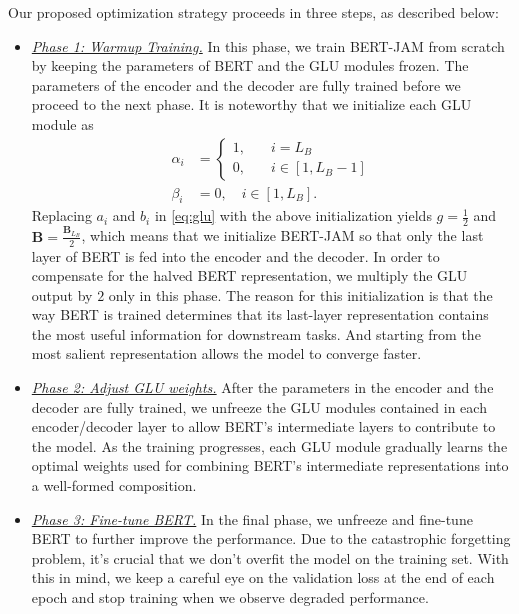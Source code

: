 \documentclass[review]{elsarticle}
\begin{document}
Our proposed optimization strategy proceeds in three steps, as described below:
\begin{itemize}
    \item \underline{\textit{Phase 1: Warmup Training.}} 
In this phase, we train BERT-JAM from scratch by keeping the parameters of BERT and the GLU modules frozen. The parameters of the encoder and the decoder are fully trained before we proceed to the next phase.
It is noteworthy that we initialize each GLU module as
\begin{equation}
\begin{aligned}
    \alpha_i  &= \left\{
        \begin{aligned}
            1, \quad & i = L_B \\
            0, \quad & i \in [1, L_B-1]
        \end{aligned}
    \right. \\
    \beta_i  &=0, \quad i \in [1, L_B]. 
\end{aligned}
\end{equation}
Replacing $a_i$ and $b_i$ in \cref{eq:glu} with the above initialization yields $g=\frac{1}{2}$ and $\bm{B}=\frac{\bm{B}_{L_B}}{2}$, which means that we initialize BERT-JAM so that only the last layer of BERT is fed into the encoder and the decoder. In order to compensate for the halved BERT representation, we multiply the GLU output by $2$ only in this phase. 
The reason for this initialization is that the way BERT is trained determines that its last-layer representation contains the most useful information for downstream tasks. 
And starting from the most salient representation allows the model to converge faster.

\item \underline{\textit{Phase 2: Adjust GLU weights.}} 
After the parameters in the encoder and the decoder are fully trained, we unfreeze the GLU modules contained in each encoder/decoder layer to allow BERT's intermediate layers to contribute to the model. As the training progresses, each GLU module gradually learns the optimal weights used for combining BERT's intermediate representations into a well-formed composition. 

\item \underline{\textit{Phase 3: Fine-tune BERT.}} 
In the final phase, we unfreeze and fine-tune BERT to further improve the performance. Due to the catastrophic forgetting problem, it's crucial that we don't overfit the model on the training set. With this in mind, we keep a careful eye on the validation loss at the end of each epoch and stop training when we observe degraded performance.

\end{itemize}
\end{document}
